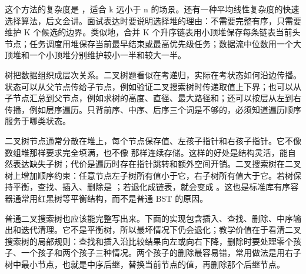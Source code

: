 这个方法的复杂度是 ，适合 k 远小于 n 的场景。还有一种平均线性复杂度的快速选择算法，后文会讲。面试表达时要说明选择堆的理由：不需要完整有序，只需要维护 K 个候选的边界。类似地，合并 K 个升序链表用小顶堆保存每条链表当前头节点；任务调度用堆保存当前最早结束或最高优先级任务；数据流中位数用一个大顶堆和一个小顶堆分别维护较小一半和较大一半。

树把数据组织成层次关系。二叉树题看似在考递归，实际在考状态如何沿边传播。状态可以从父节点传给子节点，例如验证二叉搜索树时传递取值上下界；也可以从子节点汇总到父节点，例如求树的高度、直径、最大路径和；还可以按层从左到右传播，例如层序遍历。只背前序、中序、后序三个词是不够的，必须知道遍历顺序服务于哪类状态。

二叉树节点通常分散在堆上，每个节点保存值、左孩子指针和右孩子指针。它不像数组堆那样要求完全填满，也不像  那样连续存储。这样的好处是结构灵活，能自然表达缺失子树；代价是遍历时存在指针跳转和额外空间开销。二叉搜索树在二叉树上增加顺序约束：任意节点左子树所有值小于它，右子树所有值大于它。若树保持平衡，查找、插入、删除是 ；若退化成链表，就会变成 。这也是标准库有序容器通常用红黑树等平衡结构，而不是普通 BST 的原因。

普通二叉搜索树也应该能完整写出来。下面的实现包含插入、查找、删除、中序输出和迭代清理。它不是平衡树，所以最坏情况下仍会退化；教学价值在于看清二叉搜索树的局部规则：查找和插入沿比较结果向左或向右下降，删除时要处理零个孩子、一个孩子和两个孩子三种情况。两个孩子的删除最容易错，常用做法是用右子树中最小节点，也就是中序后继，替换当前节点的值，再删除那个后继节点。

